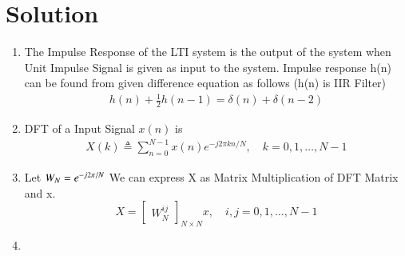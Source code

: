 \documentclass[journal,12pt,twocolumn]{IEEEtran}
\renewcommand\thesection{\arabic{section}}
\begin{document}
\section{Solution}
\begin{enumerate}[label=\thesection.\arabic*.,ref=\thesection.\theenumi]
\item
The Impulse Response of the LTI system is the output of the system when Unit Impulse Signal is given as input to the system.
Impulse response h(n) can be found from given difference equation as follows (h(n) is IIR Filter)
\begin{align}
    h(n) + \frac{1}{2}h(n-1) = \delta(n) + \delta(n-2)	
\end{align}

\item
DFT of a Input Signal $x(n)$ is 
\begin{align}
X(k) \triangleq \sum_{n=0}^{N-1} x(n) e^{-j 2 \pi k n / N}, \quad k=0,1, \ldots, N-1
\end{align}

\item
Let $W_{N} = e^{-j2\pi/N} \\$ 
We can express X as Matrix Multiplication of DFT Matrix and x.
\begin{equation}
X = 
\begin{bmatrix}
W^{ij}_{N} 
\end{bmatrix}_{N \times N}
x, \quad i,j = 0,1, \ldots, N-1
\end{equation}
\item


\end{enumerate}
\end{document}
